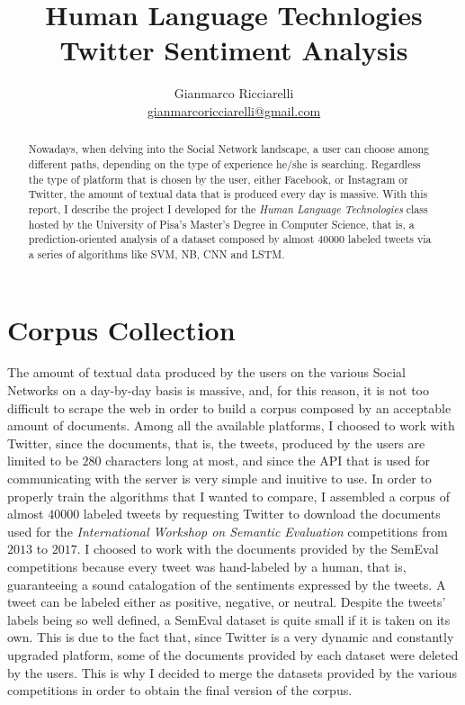 \documentclass[11pt,twocolumn]{article}
\title{\textbf{Human Language Technlogies \\ Twitter Sentiment Analysis}}
\author{Gianmarco Ricciarelli \\ \href{mailto:gianmarcoricciarelli@gmail.com}{gianmarcoricciarelli@gmail.com}}
\date{}
\begin{document}
    \maketitle

    \begin{abstract}
        \noindent
        Nowadays, when delving into the Social Network landscape, a user can choose among different
        paths, depending on the type of experience he/she is searching. Regardless the type of platform that
        is chosen by the user, either Facebook, or Instagram or Twitter, the amount of textual data that is
        produced every day is massive. With this report, I describe the project I developed for the
        \textit{Human Language Technologies} class hosted by the University of Pisa's Master's Degree in
        Computer Science, that is, a prediction-oriented analysis of a dataset composed by almost $40000$
        labeled tweets via a series of algorithms like SVM, NB, CNN and LSTM.
    \end{abstract}

    \section{Corpus Collection} %
    \label{sec:corpus_collection}
        The amount of textual data produced by the users on the various Social Networks on a day-by-day
        basis is massive, and, for this reason, it is not too difficult to scrape the web in order to
        build a corpus composed by an acceptable amount of documents. Among all the available platforms, I
        choosed to work with Twitter, since the documents, that is, the tweets, produced by the users are
        limited to be $280$ characters long at most, and since the API that is used for communicating with
        the server is very simple and inuitive to use. In order to properly train the algorithms that I
        wanted to compare, I assembled a corpus of almost $40000$ labeled tweets by requesting Twitter to
        download the documents used for the \textit{International Workshop on Semantic Evaluation}
        competitions from $2013$ to $2017$. I choosed to work with the documents provided by the SemEval
        competitions because every tweet was hand-labeled by a human, that is, guaranteeing a sound
        catalogation of the sentiments expressed by the tweets. A tweet can be labeled either as
        positive, negative, or neutral. Despite the tweets' labels being so well defined, a SemEval
        dataset is quite small if it is taken on its own. This is due to the fact that, since Twitter is a
        very dynamic and constantly upgraded platform, some of the documents provided by each dataset
        were deleted by the users. This is why I decided to merge the datasets provided by the various
        competitions in order to obtain the final version of the corpus.
\end{document}
